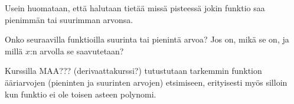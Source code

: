 \begin{tehtavasivu}
\begin{tehtava}
Usein huomataan, että halutaan tietää missä pisteessä jokin funktio saa pienimmän tai suurimman arvonsa.

Onko seuraavilla funktioilla suurinta tai pienintä arvoa? Jos on, mikä se on, ja millä $x$:n arvolla se saavutetaan?
\begin{alakohdat}
\end{alakohdat}

Kurssilla MAA??? (derivaattakurssi?) tutustutaan tarkemmin funktion ääriarvojen (pieninten ja suurinten arvojen) etsimiseen, erityisesti myös silloin kun funktio ei ole toisen asteen polynomi.
	\begin{vastaus}
	\begin{alakohdat}
	\end{alakohdat}
	\end{vastaus}
\end{tehtava}


\end{tehtavasivu}